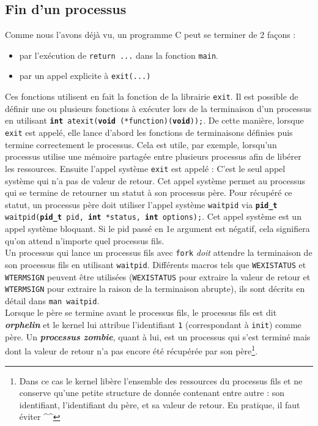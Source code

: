 \subsection{Fin d'un processus}
Comme nous l'avons déjà vu, un programme C peut se terminer de 2 façons :
\begin{itemize}
  \item par l'exécution de \texttt{return ...}  dans la fonction \texttt{main}.
  \item par un appel explicite à \texttt{exit(...)}
\end{itemize}
Ces fonctions utilisent en fait la fonction de la librairie \texttt{exit}. Il est possible de définir une ou plusieurs fonctions à exécuter lors de la terminaison d'un processus en utilisant \texttt{\textbf{int} atexit(\textbf{void} (*function)(\textbf{void}));}. De cette manière, lorsque \texttt{exit} est appelé, elle lance d'abord les fonctions de terminaisons définies puis termine correctement le processus. Cela est utile, par exemple, lorsqu'un processus utilise une mémoire partagée entre plusieurs processus afin de libérer les ressources. Ensuite l'appel système \texttt{exit} est appelé : C'est le seul appel système qui n'a pas de valeur de retour. Cet appel système permet au processus qui se termine de retourner un statut à son processus père. Pour récupéré ce statut, un processus père doit utiliser l'appel système \texttt{waitpid} via  \texttt{\textbf{pid\_t} waitpid(\textbf{pid\_t} pid, \textbf{int} *status, \textbf{int} options);}. Cet appel système est un appel système bloquant. Si le pid passé en 1e argument est négatif, cela signifiera qu'on attend n'importe quel processus fils. \\
Un processus qui lance un processus fils avec \texttt{fork} \textit{doit} attendre la terminaison de son processus fils en utilisant \texttt{waitpid}. Différents macros tels que \texttt{WEXISTATUS} et \texttt{WTERMSIGN} peuvent être utilisées (\texttt{WEXISTATUS} pour extraire la valeur de retour et \texttt{WTERMSIGN} pour extraire la raison de la terminaison abrupte), ils sont décrits en détail dans \texttt{man waitpid}. \\

Lorsque le père se termine avant le processus fils, le processus fils est dit \textbf{\textit{orphelin}} et le kernel lui attribue l'identifiant \texttt{1} (correspondant à \texttt{init}) comme père. Un \textit{\textbf{processus zombie}}, quant à lui, est un processus qui s'est terminé mais dont la valeur de retour n'a pas encore été récupérée par son père\footnote{Dans ce cas le kernel libère l'ensemble des ressources du processus fils et ne conserve qu'une petite structure de donnée contenant entre autre : son identifiant, l'identifiant du père, et sa valeur de retour. En pratique, il faut éviter \^{}\^{}}.

